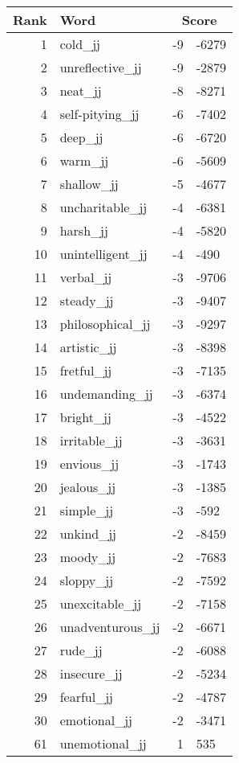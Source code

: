 \begin{longtable}[!htbp]{| rlr@{.}l |}
    \hline
    \textbf{Rank} & \textbf{Word} & \multicolumn{2}{c|}{\textbf{Score}} \\
    \hline
    \endhead
    1 & cold\_jj & -9 & -6279 \\
    2 & unreflective\_jj & -9 & -2879 \\
    3 & neat\_jj & -8 & -8271 \\
    4 & self-pitying\_jj & -6 & -7402 \\
    5 & deep\_jj & -6 & -6720 \\
    6 & warm\_jj & -6 & -5609 \\
    7 & shallow\_jj & -5 & -4677 \\
    8 & uncharitable\_jj & -4 & -6381 \\
    9 & harsh\_jj & -4 & -5820 \\
    10 & unintelligent\_jj & -4 & -490 \\
    11 & verbal\_jj & -3 & -9706 \\
    12 & steady\_jj & -3 & -9407 \\
    13 & philosophical\_jj & -3 & -9297 \\
    14 & artistic\_jj & -3 & -8398 \\
    15 & fretful\_jj & -3 & -7135 \\
    16 & undemanding\_jj & -3 & -6374 \\
    17 & bright\_jj & -3 & -4522 \\
    18 & irritable\_jj & -3 & -3631 \\
    19 & envious\_jj & -3 & -1743 \\
    20 & jealous\_jj & -3 & -1385 \\
    21 & simple\_jj & -3 & -592 \\
    22 & unkind\_jj & -2 & -8459 \\
    23 & moody\_jj & -2 & -7683 \\
    24 & sloppy\_jj & -2 & -7592 \\
    25 & unexcitable\_jj & -2 & -7158 \\
    26 & unadventurous\_jj & -2 & -6671 \\
    27 & rude\_jj & -2 & -6088 \\
    28 & insecure\_jj & -2 & -5234 \\
    29 & fearful\_jj & -2 & -4787 \\
    30 & emotional\_jj & -2 & -3471 \\
    61 & unemotional\_jj & 1 & 535 \\

\end{longtable}
